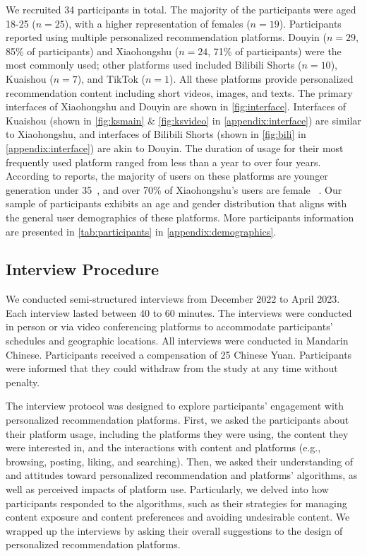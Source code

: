We recruited 34 participants in total. The majority of the participants were aged 18-25 ($n = 25$), with a higher representation of females ($n = 19$). Participants reported using multiple personalized recommendation platforms. Douyin ($n = 29$, 85\% of participants) and Xiaohongshu ($n = 24$, 71\% of participants) were the most commonly used; other platforms used included Bilibili Shorts ($n = 10$), Kuaishou ($n = 7$), and TikTok ($n = 1$). All these platforms provide personalized recommendation content including short videos, images, and texts. The primary interfaces of Xiaohongshu and Douyin are shown in \autoref{fig:interface}. Interfaces of Kuaishou (shown in \autoref{fig:ksmain} \& \autoref{fig:ksvideo} in \autoref{appendix:interface}) are similar to Xiaohongshu, and interfaces of Bilibili Shorts (shown in \autoref{fig:bili} in \autoref{appendix:interface}) are akin to Douyin. The duration of usage for their most frequently used platform ranged from less than a year to over four years. According to reports, the majority of users on these platforms are younger generation under 35~\cite{flow2023demographic,marketingtochina2024douyin,kuaishou2022user}, and over 70\% of Xiaohongshu's users are female ~\cite{flow2023demographic}. Our sample of participants exhibits an age and gender distribution that aligns with the general user demographics of these platforms. More participants information are presented in \autoref{tab:participants} in \autoref{appendix:demographics}.

\subsection{Interview Procedure}
We conducted semi-structured interviews from December 2022 to April 2023. Each interview lasted between 40 to 60 minutes. The interviews were conducted in person or via video conferencing platforms to accommodate participants' schedules and geographic locations. All interviews were conducted in Mandarin Chinese. Participants received a compensation of 25 Chinese Yuan. Participants were informed that they could withdraw from the study at any time without penalty.

The interview protocol was designed to explore participants' engagement with personalized recommendation platforms. First, we asked the participants about their platform usage, including the platforms they were using, the content they were interested in, and the interactions with content and platforms (e.g., browsing, posting, liking, and searching). Then, we asked their understanding of and attitudes toward personalized recommendation and platforms’ algorithms, as well as perceived impacts of platform use. Particularly, we delved into how participants responded to the algorithms, such as their strategies for managing content exposure and content preferences and avoiding undesirable content. We wrapped up the interviews by asking their overall suggestions to the design of personalized recommendation platforms.

